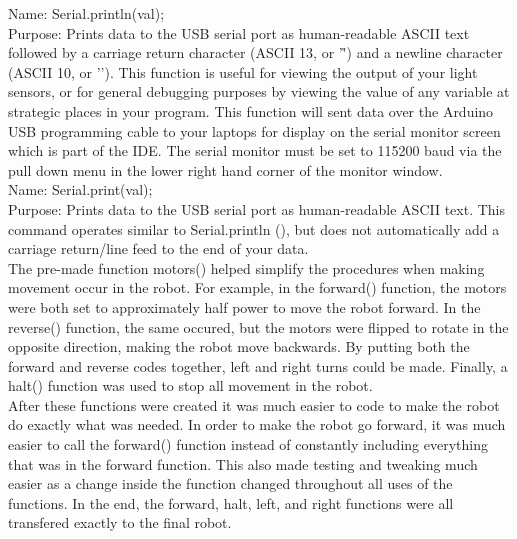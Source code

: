 \documentclass{article}
\begin{document}
Name: Serial.println(val); \\
Purpose:  Prints data to the USB serial port as human-readable ASCII text followed by a carriage return character (ASCII 13, or '\r') and a newline character (ASCII 10, or '\n'). This function is useful for viewing the output of your light sensors, or for general debugging purposes by viewing the value of any variable at strategic places in your program.  This function will sent data over the Arduino USB programming cable to your laptops for display on the serial monitor screen which is part of the IDE. The serial monitor must be set to 115200 baud via the pull down menu in the lower right hand corner of the monitor window. \\

Name: Serial.print(val); \\
Purpose:  Prints data to the USB serial port as human-readable ASCII text. This command operates similar to Serial.println (), but does not automatically add a carriage return/line feed to the end of your data. \\
    
    
    The pre-made function motors() helped simplify the procedures when making movement occur in the robot. For example, in the forward() function, the motors were both set to approximately half power to move the robot forward. In the reverse() function, the same occured, but the motors were flipped to rotate in the opposite direction, making the robot move backwards. By putting both the forward and reverse codes together, left and right turns could be made. Finally, a halt() function was used to stop all movement in the robot. \\
    
    After these functions were created it was much easier to code to make the robot do exactly what was needed. In order to make the robot go forward, it was much easier to call the forward() function instead of constantly including everything that was in the forward function. This also made testing and tweaking much easier as a change inside the function changed throughout all uses of the functions. In the end, the forward, halt, left, and right functions were all transfered exactly to the final robot.\\
    
    
\end{document}
